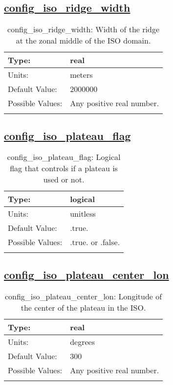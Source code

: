 \subsection[config\_iso\_ridge\_width]{\hyperref[sec:nm_tab_iso]{config\_iso\_ridge\_width}}
\label{subsec:nm_sec_config_iso_ridge_width}
\begin{center}
\begin{longtable}{| p{2.0in} || p{4.0in} |}
    \hline
    Type: & real \\
    \hline
    Units: & \si{meters} \\
    \hline
    Default Value: & 2000000 \\
    \hline
    Possible Values: & Any positive real number. \\
    \hline
    \caption{config\_iso\_ridge\_width: Width of the ridge at the zonal middle of the ISO domain.}
\end{longtable}
\end{center}
\subsection[config\_iso\_plateau\_flag]{\hyperref[sec:nm_tab_iso]{config\_iso\_plateau\_flag}}
\label{subsec:nm_sec_config_iso_plateau_flag}
\begin{center}
\begin{longtable}{| p{2.0in} || p{4.0in} |}
    \hline
    Type: & logical \\
    \hline
    Units: & \si{unitless} \\
    \hline
    Default Value: & .true. \\
    \hline
    Possible Values: & .true. or .false. \\
    \hline
    \caption{config\_iso\_plateau\_flag: Logical flag that controls if a plateau is used or not.}
\end{longtable}
\end{center}
\subsection[config\_iso\_plateau\_center\_lon]{\hyperref[sec:nm_tab_iso]{config\_iso\_plateau\_center\_lon}}
\label{subsec:nm_sec_config_iso_plateau_center_lon}
\begin{center}
\begin{longtable}{| p{2.0in} || p{4.0in} |}
    \hline
    Type: & real \\
    \hline
    Units: & \si{degrees} \\
    \hline
    Default Value: & 300 \\
    \hline
    Possible Values: & Any positive real number. \\
    \hline
    \caption{config\_iso\_plateau\_center\_lon: Longitude of the center of the plateau in the ISO.}
\end{longtable}
\end{center}
